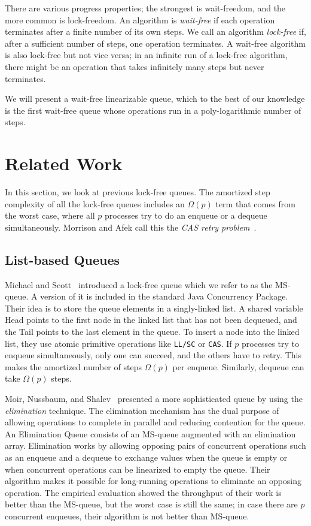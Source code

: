 \documentclass[acmsmall,nonacm,anonymous]{acmart}
\renewcommand{\it}[1]{\textit{#1}}
\begin{document}
There are various progress properties; the strongest is wait-freedom, and the more common is lock-freedom. An algorithm is \textit{wait-free} if each operation terminates after a finite number of its own steps. We call an algorithm \textit{lock-free} if, after a sufficient number of steps, one operation terminates. A wait-free algorithm is also lock-free but not vice versa; in an infinite run of a lock-free algorithm, there might be an operation that takes infinitely many steps but never terminates.

We will present a wait-free linearizable queue, which to the best of our knowledge  is the first wait-free queue whose operations run in a poly-logarithmic number of steps. 


\section{Related Work}
In this section, we look at previous lock-free queues. The amortized step complexity of all the lock-free queues includes an $\Omega(p)$ term that comes from the worst case, where all $p$ processes try to do an enqueue or a dequeue simultaneously. Morrison and Afek call this the \textit{CAS retry problem}~\cite{DBLP:conf/ppopp/MorrisonA13}. 

\subsection{List-based Queues}
Michael and Scott~\cite{DBLP:conf/podc/MichaelS96} introduced a lock-free queue which we refer to as the MS-queue. A version of it is included in the standard Java Concurrency Package. Their idea is to store the queue elements in a singly-linked list. A shared variable Head points to the first node in the linked list that has not been dequeued, and the Tail points to the last element in the queue. To insert a node into the linked list, they use atomic primitive operations like \texttt{LL/SC} or \texttt{CAS}. If $p$ processes try to enqueue simultaneously, only one can succeed, and the others have to retry. This makes the amortized number of steps $\Omega(p)$ per enqueue. Similarly, dequeue can take $\Omega(p)$ steps.

Moir, Nussbaum, and Shalev~\cite{DBLP:conf/spaa/MoirNSS05} presented a more sophisticated queue by using the \it{elimination} technique. The elimination mechanism has the dual purpose of allowing operations to complete in parallel and reducing contention for the queue. An Elimination Queue consists of an MS-queue augmented with an elimination array. Elimination works by allowing opposing pairs of concurrent operations such as an enqueue and a dequeue to exchange values when the queue is empty or when concurrent operations can be linearized to empty the queue. Their algorithm makes it possible for long-running operations to eliminate an opposing operation. The empirical evaluation showed the throughput of their work is better than the MS-queue, but the worst case is still the same; in case there are $p$ concurrent enqueues, their algorithm is not better than MS-queue. 
\end{document}
